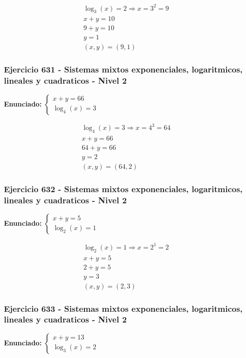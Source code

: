 \documentclass[12pt,a4paper]{article}
\begin{document}
\[
\begin{aligned}
\log_{3}\left(x\right)=2\Rightarrow x=3^{2}=9\\
x+y=10\\
9+y=10\\
y=1\\
\boxed{(x,y)=(9,1)}
\end{aligned}
\]


\subsubsection*{Ejercicio 631 - Sistemas mixtos exponenciales, logaritmicos, lineales y cuadraticos - Nivel 2}
\textbf{Enunciado:} \(\begin{cases} x+y=66\\ \log_{4}\left(x\right)=3\end{cases}\)

\[
\begin{aligned}
\log_{4}\left(x\right)=3\Rightarrow x=4^{3}=64\\
x+y=66\\
64+y=66\\
y=2\\
\boxed{(x,y)=(64,2)}
\end{aligned}
\]


\subsubsection*{Ejercicio 632 - Sistemas mixtos exponenciales, logaritmicos, lineales y cuadraticos - Nivel 2}
\textbf{Enunciado:} \(\begin{cases} x+y=5\\ \log_{2}\left(x\right)=1\end{cases}\)

\[
\begin{aligned}
\log_{2}\left(x\right)=1\Rightarrow x=2^{1}=2\\
x+y=5\\
2+y=5\\
y=3\\
\boxed{(x,y)=(2,3)}
\end{aligned}
\]


\subsubsection*{Ejercicio 633 - Sistemas mixtos exponenciales, logaritmicos, lineales y cuadraticos - Nivel 2}
\textbf{Enunciado:} \(\begin{cases} x+y=13\\ \log_{3}\left(x\right)=2\end{cases}\)
\end{document}
